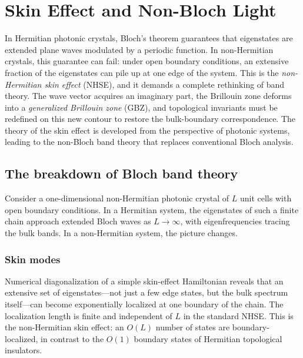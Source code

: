 \chapter{Skin Effect and Non-Bloch Light}
\label{ch:skin-effect}

\begin{chapterlead}
In Hermitian photonic crystals, Bloch's theorem guarantees that
eigenstates are extended plane waves modulated by a periodic function.
In non-Hermitian crystals, this guarantee can fail: under open
boundary conditions, an extensive fraction of the eigenstates can pile up
at one edge of the system. This is the \emph{non-Hermitian skin effect}
(NHSE), and it demands a complete rethinking of band theory. The wave
vector acquires an imaginary part, the Brillouin zone deforms into a
\emph{generalized Brillouin zone} (GBZ), and topological invariants must
be redefined on this new contour to restore the bulk-boundary
correspondence. The theory of the skin effect is developed from the
perspective of photonic systems, leading to the non-Bloch band theory
that replaces conventional Bloch analysis.
\end{chapterlead}


\section{The breakdown of Bloch band theory}
\label{sec:bloch-breakdown}

Consider a one-dimensional non-Hermitian photonic crystal of $L$ unit
cells with open boundary conditions. In a Hermitian system, the
eigenstates of such a finite chain approach extended Bloch waves as
$L \to \infty$, with eigenfrequencies tracing the bulk bands. In a
non-Hermitian system, the picture changes.

\subsection{Skin modes}
\label{ssec:skin-modes}

Numerical diagonalization of a simple skin-effect Hamiltonian reveals
that an extensive set of eigenstates---not just a few edge states, but
the bulk spectrum itself---can become exponentially localized at one
boundary of the chain. The localization length is finite and independent
of $L$ in the standard NHSE. This is the non-Hermitian skin effect: an
$O(L)$ number of states are boundary-localized, in contrast to the
$O(1)$ boundary states of Hermitian topological insulators.

